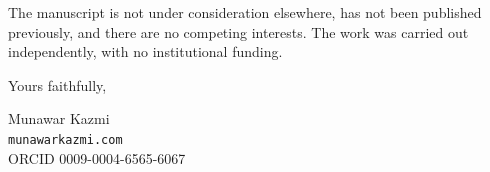 \documentclass[11pt]{article}
\begin{document}
The manuscript is not under consideration elsewhere, has not been published
previously, and there are no competing interests. The work was carried out
independently, with no institutional funding.

\bigskip

\noindent Yours faithfully,

\bigskip

\noindent Munawar Kazmi\\
\texttt{munawarkazmi.com}\\
ORCID 0009-0004-6565-6067
\end{document}
